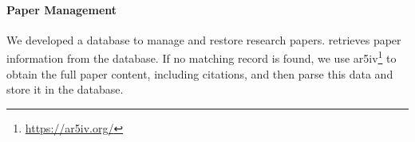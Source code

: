 \paragraph{Paper Management} 
We developed a database to manage and restore research papers. \pasa retrieves paper information from the database. If no matching record is found, we use ar5iv\footnote{\url{https://ar5iv.org/}} to obtain the full paper content, including citations, and then parse this data and store it in the database.

\begin{table*}[htbp]

\centering
{}
\caption{Results on AutoScholarQuery test set. *: Due
to the need for manual query submission, the ChatGPT baseline is evaluated on 100 randomly sampled instances. Results for all
methods on this subset are reported in Table~\ref{main_results_100}.}
\label{main_results}
\vspace{-0.2cm}
\end{table*}

